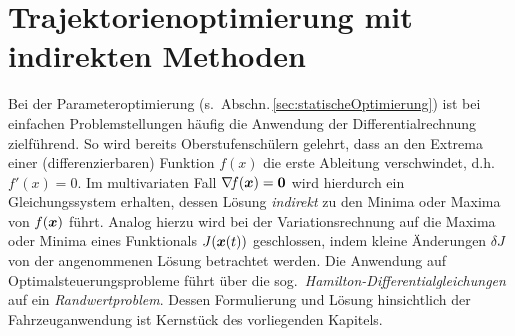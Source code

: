 
\chapter{Trajektorienoptimierung mit indirekten Methoden} \label{chap:dynamische_Optimierung_indirekt}
Bei der Parameteroptimierung (s.\ Abschn.\,\ref{sec:statischeOptimierung}) ist bei einfachen Problemstellungen häufig die Anwendung der Differentialrechnung zielführend. So wird bereits Oberstufenschülern gelehrt, dass an den Extrema einer (differenzierbaren) Funktion $f(x)$ die erste Ableitung verschwindet, d.h. $f'(x) = 0$. %
Im multivariaten Fall $\nabla\!f(\boldsymbol{x}) = \boldsymbol{0}$ wird hierdurch ein Gleichungssystem erhalten, dessen Lösung \emph{indirekt} zu den Minima oder Maxima von $f(\boldsymbol{x})$ führt. Analog hierzu wird bei der Variationsrechnung auf die Maxima oder Minima eines Funktionals $J(\boldsymbol{x}(t))$ geschlossen, indem kleine Änderungen $\delta J$ von der angenommenen Lösung betrachtet werden. Die Anwendung auf Optimalsteuerungsprobleme führt über die sog.\ \emph{Hamilton-Differentialgleichungen} auf ein \emph{Randwertproblem}. Dessen Formulierung und Lösung hinsichtlich der Fahrzeuganwendung ist Kernstück des vorliegenden Kapitels.

